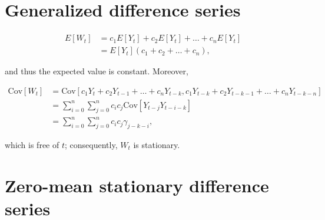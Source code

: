 \documentclass[]{book}
\begin{document}
\section{Generalized difference
series}\label{generalized-difference-series}

\begin{align}
  E[W_t] & = c_1E[Y_t]+c_2E[Y_t] + \dots + c_n E[Y_t]\\
         & = E[Y_t](c_1 + c_2 + \dots + c_n),
\end{align}

and thus the expected value is constant. Moreover,

\begin{align}
  \text{Cov}[W_t] & = \text{Cov}[c_1 Y_t + c_2 Y_{t-1} + \dots + c_n Y_{t-k}, c_1 Y_{t-k} + c_2 Y_{t-k-1} + \dots + c_n Y_{t-k-n}] \\
                  & = \sum_{i=0}^n \sum_{j=0}^n c_i c_j \text{Cov}[Y_{t-j}Y_{t-i-k}] \\
                  & = \sum_{i=0}^n \sum_{j=0}^n c_i c_j \gamma_{j-k-i},
\end{align}

which is free of \(t\); consequently, \(W_t\) is stationary.

\section{Zero-mean stationary difference
series}\label{zero-mean-stationary-difference-series}
\end{document}
